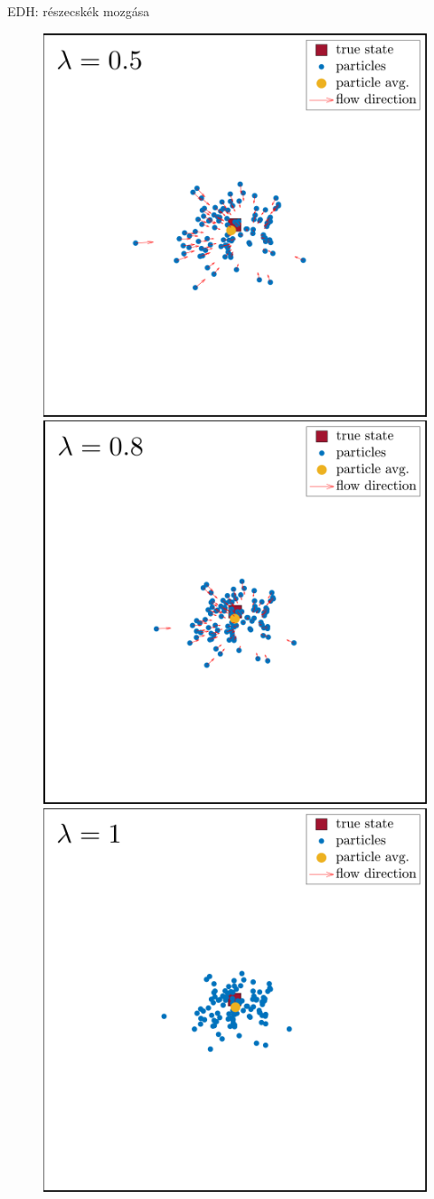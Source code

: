 \documentclass{beamer}
\begin{document}
\begin{frame}{EDH: részecskék mozgása}
\begin{overlayarea}{\textwidth}{\textheight}
\begin{figure}
{            }%
            {%
                \includegraphics[width=.6\textwidth]{_Figures/l05.png}%
            }%
            {%
                \includegraphics[width=.6\textwidth]{_Figures/l08.png}%
            }%
            {%
                \includegraphics[width=.6\textwidth]{_Figures/l1.png}%
            }%
        \end{figure}
    \end{overlayarea}

\end{frame}
\end{document}
